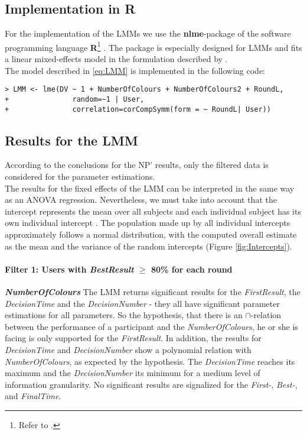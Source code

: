 \subsection{Implementation in R}

For the implementation of the \ac{LMM}s we use the \textbf{nlme}-package of the software programming language \textbf{R}\footnote{Refer to \cite{R2012}.} . The package is especially designed for \ac{LMM}s  \citep{Pinheiro2013} and fits a linear mixed-effects model in the formulation described by \cite{Laird1982}.\\
The model described in \ref{eq:LMM} is implemented in the following code:
\begin{verbatim}
> LMM <- lme(DV ~ 1 + NumberOfColours + NumberOfColours2 + RoundL, 
+               random=~1 | User, 
+               correlation=corCompSymm(form = ~ RoundL| User))
\end{verbatim}

\subsection{Results for the \ac{LMM}}

According to the conclusions for the \acl{NP}' results, only the filtered data is considered for the parameter estimations.\\
The results for the fixed effects of the \ac{LMM} can be interpreted in the same way as an ANOVA regression. Nevertheless, we must take into account that the intercept represents the mean over all subjects and each individual subject has its own individual intercept \citep{Seltman2012}. The population made up by all individual intercepts approximately follows a normal distribution, with the computed overall estimate as the mean and the variance of the random intercepts (Figure \ref{fig:Intercepts}).

\paragraph{Filter 1: Users with \textit{BestResult} $\geq$ 80\% for each round}
\textbf{\textit{NumberOfColours} } The \ac{LMM} returns significant results for the \textit{FirstResult}, the \textit{DecisionTime} and the \textit{DecisionNumber}  - they all have significant parameter estimations for all parameters. So the hypothesis, that there is an \textbf{$\cap$}-relation between the performance of a participant and the \textit{NumberOfColours}, he or she is facing is only supported for the \textit{FirstResult}. In addition, the results for \textit{DecisionTime} and \textit{DecisionNumber} show a polynomial relation with \textit{NumberOfColours}, as expected by the hypothesis. The \textit{DecisionTime} reaches its maximum and the \textit{DecisionNumber} its minimum for a medium level of information granularity. No significant results are signalized for the \textit{First-}, \textit{Best-}, and \textit{FinalTime}.

